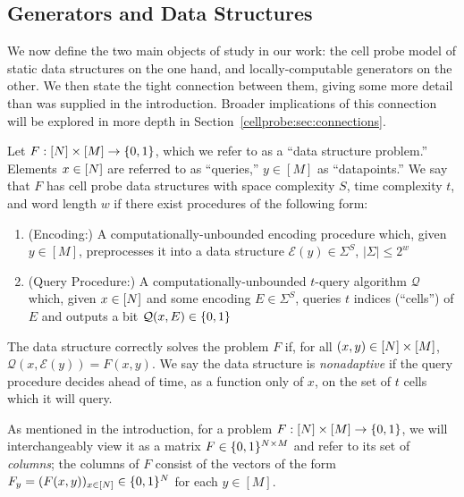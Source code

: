 \subsection{Generators and Data Structures}\label{cellprobe:subsec:gen-vs-cell}
We now define the two main objects of study in our work: the cell probe model of static data structures on the one hand, and locally-computable generators on the other. We then state the tight connection between them, giving some more detail than was supplied in the introduction. Broader implications of this connection will be explored in more depth in Section~\ref{cellprobe:sec:connections}.

\begin{definition}
Let $F: [N] \times [M] \to \{0,1\}$, which we refer to as a ``data structure problem.'' Elements $x \in [N]$ are referred to as ``queries,'' $y \in [M]$ as ``datapoints.'' We say that $F$ has cell probe data structures with space complexity $S$, time complexity $t$, and word length $w$ if there exist procedures of the following form:
\begin{enumerate}
    \item (Encoding:) A computationally-unbounded encoding procedure which, given $y \in [M]$, preprocesses it into a data structure $\mathcal{E}(y) \in \Sigma^S$, $|\Sigma| \leq 2^w$ 
    \item (Query Procedure:) A computationally-unbounded $t$-query algorithm $\mathcal{Q}$ which, given $x \in [N]$ and some encoding $E \in \Sigma^S$, queries $t$ indices (``cells'') of $E$ and outputs a bit $\mathcal{Q}(x,E) \in \{0,1\}$
\end{enumerate}
The data structure correctly solves the problem $F$ if, for all $(x,y) \in [N] \times [M]$, $\mathcal{Q}(x,\mathcal{E}(y)) = F(x,y)$. We say the data structure is \emph{nonadaptive} if the query procedure decides ahead of time, as a function only of $x$, on the set of $t$ cells which it will query.
\end{definition}
As mentioned in the introduction, for a problem $F: [N] \times [M] \to \{0,1\}$, we will interchangeably view it as a matrix $F \in \{0,1\}^{N \times M}$ and refer to its set of \emph{columns}; the columns of $F$ consist of the vectors of the form $F_y = (F(x,y))_{x \in [N]}\in \{0,1\}^N$ for each $y \in [M]$.

